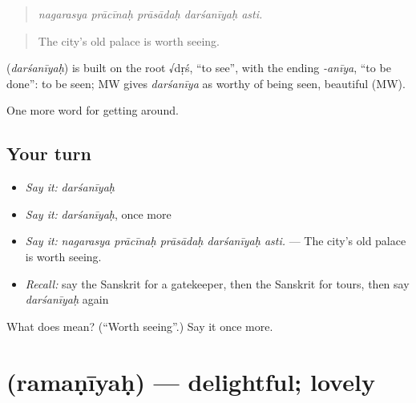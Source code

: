 \begin{quote}
    
\end{quote}

\begin{quote}
\emph{nagarasya prācīnaḥ prāsādaḥ darśanīyaḥ asti.}
\end{quote}

\begin{quote}
The city's old palace is worth seeing.
\end{quote}

\begin{cousinweb}
\textbf{} (\emph{darśanīyaḥ}) is built on the root √dṛś, \textquotedblleft{}to see\textquotedblright{}, with the ending \emph{-anīya}, \textquotedblleft{}to be done\textquotedblright{}: to be seen; MW gives \emph{darśanīya} as worthy of being seen, beautiful (MW).
\end{cousinweb}

\begin{grammarlens}[title={What you've built}]
One more word for getting around.
\end{grammarlens}

\subsection*{Your turn}
\begin{itemize}
\raggedright
  \item \emph{Say it:} \emph{darśanīyaḥ}
  \item \emph{Say it:} \emph{darśanīyaḥ}, once more
  \item \emph{Say it:} \emph{nagarasya prācīnaḥ prāsādaḥ darśanīyaḥ asti.} — The city's old palace is worth seeing.
  \item \emph{Recall:} say the Sanskrit for a gatekeeper, then the Sanskrit for tours, then say \emph{darśanīyaḥ} again
\end{itemize}

\begin{tcolorbox}[breakable,colback=teal!4,colframe=teal!35!black,title={Before you move on}]
What does  mean? (\textquotedblleft{}Worth seeing\textquotedblright{}.) Say it once more.
\end{tcolorbox}
\section[\texorpdfstring{\sk{रमणीयः} (ramaṇīyaḥ)}{रमणीयः (ramaṇīyaḥ)}]{ (ramaṇīyaḥ) — delightful; lovely}

